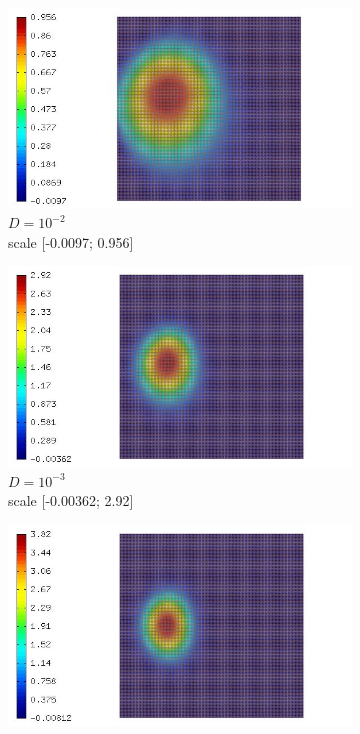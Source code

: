 \documentclass[mathserif]{beamer}
\begin{document}
\begin{frame}
\begin{figure}[H]
\begin{subfigure}[H]{0.02\textwidth}
	\end{subfigure}
	\begin{subfigure}[H]{0.3\textwidth}
		\centering
		\includegraphics[width=.9\textwidth, trim = 65mm 0mm 0mm 0mm, clip]{images/timedep-multiscale/convergence/16384_eps=001_402.jpg}
		\vspace{-3mm}
		\caption{$D = 10^{-2}$\\\vspace{-2mm}scale [-0.0097; 0.956]}
	\end{subfigure}
	\begin{subfigure}[H]{0.3\textwidth}
		\centering
		\includegraphics[width=.9\textwidth, trim = 65mm 0mm 0mm 0mm, clip]{images/timedep-multiscale/convergence/16384_eps=0001_402.jpg}
		\vspace{-3mm}
		\caption{$D = 10^{-3}$\\\vspace{-2mm}scale [-0.00362; 2.92]}
	\end{subfigure}
	\begin{subfigure}[H]{0.3\textwidth}
		\centering
		\includegraphics[width=.9\textwidth, trim = 65mm 0mm 0mm 0mm, clip]{images/timedep-multiscale/convergence/16384_eps=0_402.jpg}

\end{subfigure}
\end{figure}
\end{frame}
\end{document}
